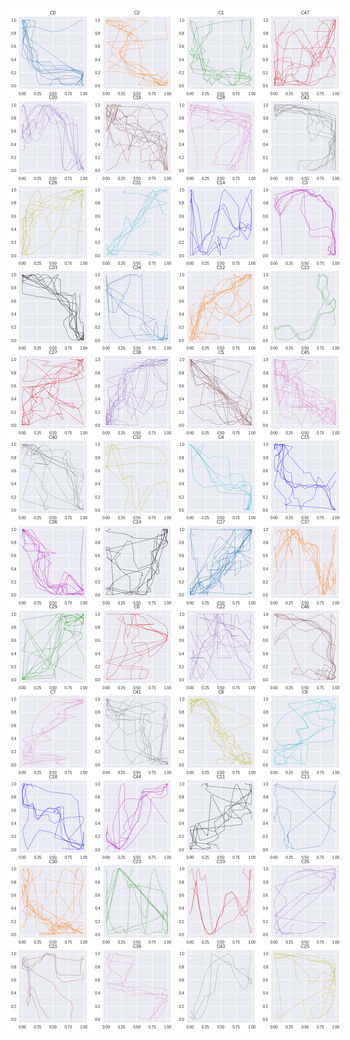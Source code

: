 \begin{figure}[h]
  \centering
  \hspace{.5em}
   \begin{subfigure}[c]{0.35\linewidth}
     \includegraphics[width=\linewidth]{figs/clusters/CLU_AP_ALL[EDR;e=.101].png}

\end{subfigure}
\end{figure}
